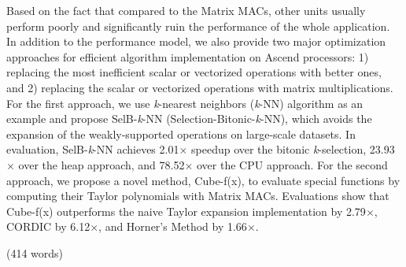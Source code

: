 Based on the fact that compared to the Matrix MACs, other units usually perform poorly and significantly ruin the performance of the whole application.
In addition to the performance model, we also provide two major optimization approaches for efficient algorithm implementation on Ascend processors: 1) replacing the most inefficient scalar or vectorized operations with better ones, and 2) replacing the scalar or vectorized operations with matrix multiplications. For the first approach, we use \textit{k}-nearest neighbors (\textit{k}-NN) algorithm as an example and propose SelB-\textit{k}-NN (Selection-Bitonic-\textit{k}-NN), which avoids the expansion of the weakly-supported operations on large-scale datasets. In evaluation, SelB-\textit{k}-NN achieves 2.01$\times$ speedup over the bitonic \textit{k}-selection, 23.93$\times$ over the heap approach, and 78.52$\times$ over the CPU approach. For the second approach, we propose a novel method, Cube-f(x), to evaluate special functions by computing their Taylor polynomials with Matrix MACs. Evaluations show that Cube-f(x) outperforms the naive Taylor expansion implementation by 2.79$\times$, CORDIC by 6.12$\times$, and Horner's Method by 1.66$\times$.

(414 words)